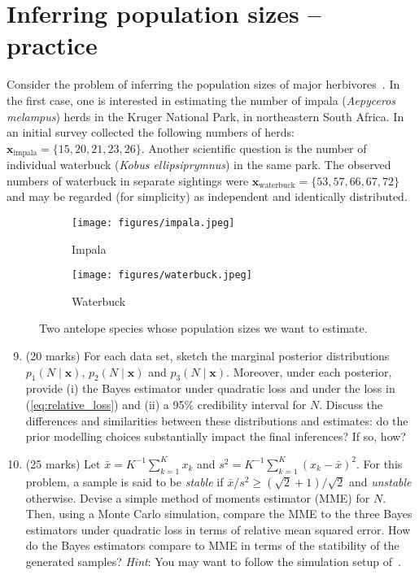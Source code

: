 \documentclass[a4paper,10pt, notitlepage]{report}
\begin{document}
\section*{Inferring population sizes -- practice}
Consider the problem of inferring the population sizes of major herbivores~\citep{Carroll1985}.
In the first case, one is interested in estimating the number of impala (\textit{Aepyceros melampus}) herds in the Kruger National Park, in northeastern South Africa.
In an initial survey collected the following numbers of herds: $\boldsymbol{x}_{\text{impala}} = \{15, 20, 21, 23, 26\}$.
Another scientific question is the number of individual waterbuck (\textit{Kobus ellipsiprymnus}) in the same park.
The observed numbers of waterbuck in separate sightings were $\boldsymbol{x}_{\text{waterbuck}} = \{53, 57, 66, 67, 72\}$ and may be regarded (for simplicity) as independent and identically distributed.

\begin{figure}[H]
     \centering
     \begin{subfigure}[b]{0.45\textwidth}
         \centering
         \texttt{[image: figures/impala.jpeg]}
         \caption{Impala}
     \end{subfigure}
     \begin{subfigure}[b]{0.45\textwidth}
         \centering
         \texttt{[image: figures/waterbuck.jpeg]}
         \caption{Waterbuck}
     \end{subfigure}
        \caption{Two antelope species whose population sizes we want to estimate.}
        \label{fig:antelopes}
\end{figure}


\begin{enumerate}[label=\alph*)]
\setcounter{enumi}{8}
 \item (20 marks) For each data set, sketch the marginal posterior distributions $p_1(N \mid \boldsymbol{x})$, $p_2(N \mid \boldsymbol{x})$ and $p_3(N \mid \boldsymbol{x})$.
 Moreover, under each posterior,  provide (i) the Bayes estimator under quadratic loss and under the loss in (\ref{eq:relative_loss}) and (ii) a 95\% credibility interval for $N$.
 Discuss the differences and similarities between these distributions and estimates: do the prior modelling choices substantially impact the final inferences? If so, how?
 \item (25 marks) Let $\bar{x} = K^{-1}\sum_{k =1}^K x_k$ and $s^2 = K^{-1}\sum_{k =1}^K (x_k-\bar{x})^2$.
 For this problem, a sample is said to be \textit{stable} if $\bar{x}/s^2 \geq (\sqrt{2} + 1)/\sqrt{2}$ and \textit{unstable} otherwise.
 Devise a simple method of moments estimator (MME) for $N$.
 Then, using a Monte Carlo simulation, compare the MME to the three Bayes estimators under quadratic loss  in terms of relative mean squared error. 
 How do the Bayes estimators compare to MME in terms of the statibility of the generated samples? 
 \textit{Hint}: You may want to follow the simulation setup of~\cite{Carroll1985}. 
\end{enumerate}



\end{document}
